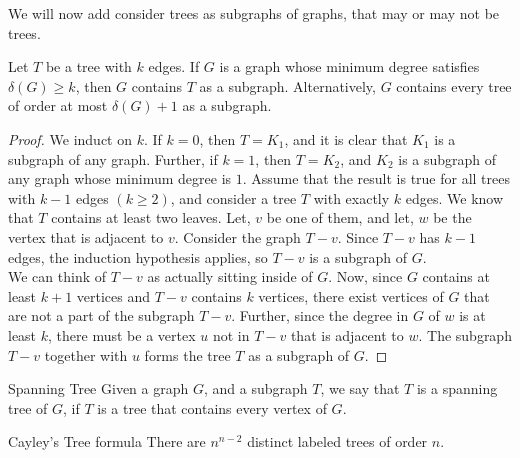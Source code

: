 \documentclass[../basic_graph_theory.tex]{subfiles}
\begin{document}
We will now add consider trees as subgraphs of graphs, that may or may not be trees.

\begin{Thm}{}{}
    Let $T$ be a tree with $k$ edges. If $G$ is a graph whose minimum degree satisfies $\delta(G) \ge k$, then $G$ contains $T$ as a subgraph. Alternatively, $G$ contains every tree of order at most $\delta(G)+1$ as a subgraph.
\end{Thm}{}{}
\begin{proof}
    We induct on $k$. If $k=0$, then $T=K_{1}$, and it is clear that $K_{1}$ is a subgraph of any graph. Further, if $k=1$, then $T=K_{2}$, and $K_{2}$ is a subgraph of any graph whose minimum degree is $1$. Assume that the result is true for all trees with $k-1$ edges $(k \ge 2)$, and consider a tree $T$ with exactly $k$ edges. We know that $T$ contains at least two leaves. Let, $v$ be one of them, and let, $w$ be the vertex that is adjacent to $v$. Consider the graph $T-v$. Since $T-v$ has $k-1$ edges, the induction hypothesis applies, so $T-v$ is a subgraph of $G$.\\
    We can think of $T-v$ as actually sitting inside of $G$. Now, since $G$ contains at least $k+1$ vertices and $T-v$ contains $k$ vertices, there exist vertices of $G$ that are not a part of the subgraph $T-v$. Further, since the degree in $G$ of $w$ is at least $k$, there must be a vertex $u$ not in $T-v$ that is adjacent to $w$. The subgraph $T-v$ together with $u$ forms the tree $T$ as a subgraph of $G$.
\end{proof}

\begin{Def}{Spanning Tree}{}
    Given a graph $G$, and a subgraph $T$, we say that $T$ is a spanning tree of $G$, if $T$ is a tree that contains every vertex of $G$.
\end{Def}

\begin{Thm}{Cayley's Tree formula}{}
    There are $n^{n-2}$ distinct labeled trees of order $n$.
\end{Thm}{}{}

\end{document}
